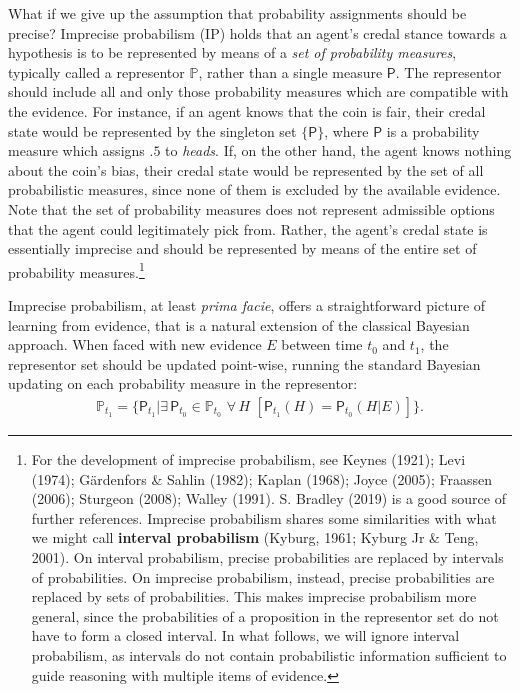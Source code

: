 \documentclass[
  10pt,
  dvipsnames,enabledeprecatedfontcommands]{scrartcl}
\begin{document}
What if we give up the assumption that probability assignments should be
precise? Imprecise probabilism (\textsf{IP}) holds that an agent's
credal stance towards a hypothesis is to be represented by means of a
\emph{set of probability measures}, typically called a representor
\(\mathbb{P}\), rather than a single measure \(\mathsf{P}\). The
representor should include all and only those probability measures which
are compatible with the evidence. For instance, if an agent knows that
the coin is fair, their credal state would be represented by the
singleton set \(\{\mathsf{P}\}\), where \(\mathsf{P}\) is a probability
measure which assigns \(.5\) to \emph{heads}. If, on the other hand, the
agent knows nothing about the coin's bias, their credal state would be
represented by the set of all probabilistic measures, since none of them
is excluded by the available evidence. Note that the set of probability
measures does not represent admissible options that the agent could
legitimately pick from. Rather, the agent's credal state is essentially
imprecise and should be represented by means of the entire set of
probability measures.\footnote{For the development of imprecise
  probabilism, see Keynes (1921); Levi (1974); Gärdenfors \& Sahlin
  (1982); Kaplan (1968); Joyce (2005); Fraassen (2006); Sturgeon (2008);
  Walley (1991). S. Bradley (2019) is a good source of further
  references. Imprecise probabilism shares some similarities with what
  we might call \textbf{interval probabilism} (Kyburg, 1961; Kyburg Jr
  \& Teng, 2001). On interval probabilism, precise probabilities are
  replaced by intervals of probabilities. On imprecise probabilism,
  instead, precise probabilities are replaced by sets of probabilities.
  This makes imprecise probabilism more general, since the probabilities
  of a proposition in the representor set do not have to form a closed
  interval. In what follows, we will ignore interval probabilism, as
  intervals do not contain probabilistic information sufficient to guide
  reasoning with multiple items of evidence.}

Imprecise probabilism, at least \emph{prima facie}, offers a
straightforward picture of learning from evidence, that is a natural
extension of the classical Bayesian approach. When faced with new
evidence \(E\) between time \(t_0\) and \(t_1\), the representor set
should be updated point-wise, running the standard Bayesian updating on
each probability measure in the representor:
\begin{align*} \label{eq:updateRepresentor}
\mathbb{P}_{t_1} = \{\mathsf{P}_{t_1}\vert \exists\, {\mathsf{P}_{t_0} \!\in  \mathbb{P}_{t_0}}\,\, \forall\, {H}\,\, \left[\mathsf{P}_{t_1}(H)=\mathsf{P}_{t_0}(H \vert E)\right] \}.
\end{align*}
\end{document}
